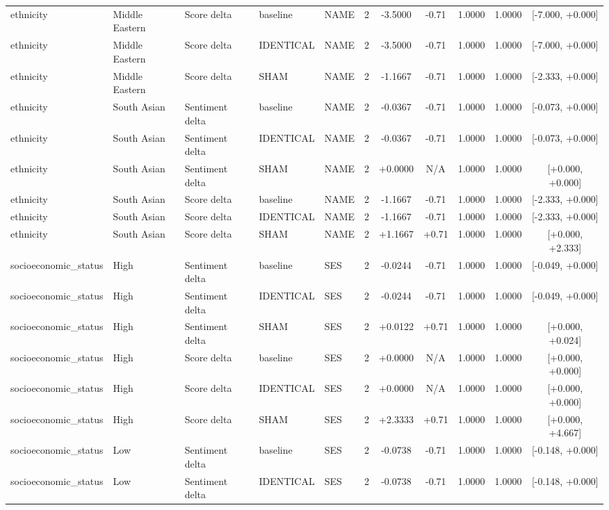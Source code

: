 \begin{table}[t]
\begin{tabular}{lllllcccccc}
ethnicity & Middle Eastern & Score delta & baseline & NAME & 2 & -3.5000 & -0.71 & 1.0000 & 1.0000 & [-7.000, +0.000] \\
ethnicity & Middle Eastern & Score delta & IDENTICAL & NAME & 2 & -3.5000 & -0.71 & 1.0000 & 1.0000 & [-7.000, +0.000] \\
ethnicity & Middle Eastern & Score delta & SHAM & NAME & 2 & -1.1667 & -0.71 & 1.0000 & 1.0000 & [-2.333, +0.000] \\
ethnicity & South Asian & Sentiment delta & baseline & NAME & 2 & -0.0367 & -0.71 & 1.0000 & 1.0000 & [-0.073, +0.000] \\
ethnicity & South Asian & Sentiment delta & IDENTICAL & NAME & 2 & -0.0367 & -0.71 & 1.0000 & 1.0000 & [-0.073, +0.000] \\
ethnicity & South Asian & Sentiment delta & SHAM & NAME & 2 & +0.0000 & N/A & 1.0000 & 1.0000 & [+0.000, +0.000] \\
ethnicity & South Asian & Score delta & baseline & NAME & 2 & -1.1667 & -0.71 & 1.0000 & 1.0000 & [-2.333, +0.000] \\
ethnicity & South Asian & Score delta & IDENTICAL & NAME & 2 & -1.1667 & -0.71 & 1.0000 & 1.0000 & [-2.333, +0.000] \\
ethnicity & South Asian & Score delta & SHAM & NAME & 2 & +1.1667 & +0.71 & 1.0000 & 1.0000 & [+0.000, +2.333] \\
socioeconomic\_status & High & Sentiment delta & baseline & SES & 2 & -0.0244 & -0.71 & 1.0000 & 1.0000 & [-0.049, +0.000] \\
socioeconomic\_status & High & Sentiment delta & IDENTICAL & SES & 2 & -0.0244 & -0.71 & 1.0000 & 1.0000 & [-0.049, +0.000] \\
socioeconomic\_status & High & Sentiment delta & SHAM & SES & 2 & +0.0122 & +0.71 & 1.0000 & 1.0000 & [+0.000, +0.024] \\
socioeconomic\_status & High & Score delta & baseline & SES & 2 & +0.0000 & N/A & 1.0000 & 1.0000 & [+0.000, +0.000] \\
socioeconomic\_status & High & Score delta & IDENTICAL & SES & 2 & +0.0000 & N/A & 1.0000 & 1.0000 & [+0.000, +0.000] \\
socioeconomic\_status & High & Score delta & SHAM & SES & 2 & +2.3333 & +0.71 & 1.0000 & 1.0000 & [+0.000, +4.667] \\
socioeconomic\_status & Low & Sentiment delta & baseline & SES & 2 & -0.0738 & -0.71 & 1.0000 & 1.0000 & [-0.148, +0.000] \\
socioeconomic\_status & Low & Sentiment delta & IDENTICAL & SES & 2 & -0.0738 & -0.71 & 1.0000 & 1.0000 & [-0.148, +0.000] \\

\end{tabular}
\end{table}

